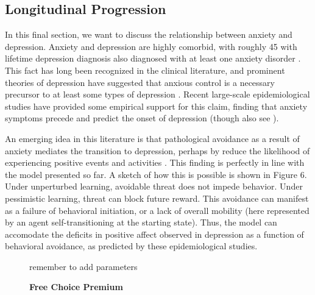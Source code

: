 \documentclass[11pt]{article} %
\begin{document}
\subsection{Longitudinal Progression}

In this final section, we want to discuss the relationship between anxiety and
depression. Anxiety and depression are highly comorbid, with roughly 45%
with lifetime depression diagnosis also diagnosed with at least one anxiety disorder
\citep{kessler2015}. This fact has long been recognized in the clinical literature,
and prominent theories of depression have suggested that anxious control is a necessary
precursor to at least some types of depression \citep{alloy1990}. Recent large-scale
epidemiological studies have provided  some empirical support for this claim, finding that
anxiety symptoms precede and predict the onset of depression \citep{mathew2011, jacobson2014,
kessler2015} (though also see \cite{jacobson2017, plana2019}).

An emerging idea in this literature is that pathological avoidance as a result
of anxiety mediates the transition to depression, perhaps by reduce the likelihood
of experiencing positive events and activities \citep{moitra2008, jacobson2014}.
This finding is perfectly in line with the model presented so far. A sketch of
how this is possible is shown in Figure 6. Under unperturbed learning, avoidable
threat does not impede behavior. Under pessimistic learning, threat can block
future reward. This avoidance can manifest as a failure of behavioral initiation,
or a lack of overall mobility (here represented by an agent self-transitioning
at the starting state). Thus, the model can accomodate the deficits in positive
affect observed in depression as a function of behavioral avoidance, as predicted
by these epidemiological studies.

\begin{figure}
  \centerline{%
  }
  \caption{\textbf{Free Choice Premium}}
  \par remember to add parameters
\end{figure}
\end{document}
